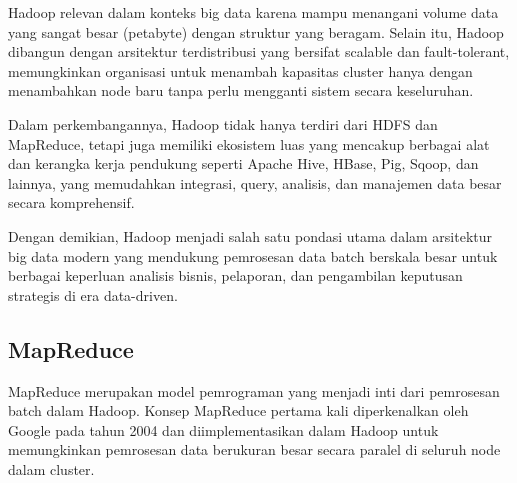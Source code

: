 Hadoop relevan dalam konteks big data karena mampu menangani volume data yang sangat besar (petabyte) dengan struktur yang beragam. Selain itu, Hadoop dibangun dengan arsitektur terdistribusi yang bersifat scalable dan fault-tolerant, memungkinkan organisasi untuk menambah kapasitas cluster hanya dengan menambahkan node baru tanpa perlu mengganti sistem secara keseluruhan.

Dalam perkembangannya, Hadoop tidak hanya terdiri dari HDFS dan MapReduce, tetapi juga memiliki ekosistem luas yang mencakup berbagai alat dan kerangka kerja pendukung seperti Apache Hive, HBase, Pig, Sqoop, dan lainnya, yang memudahkan integrasi, query, analisis, dan manajemen data besar secara komprehensif.

Dengan demikian, Hadoop menjadi salah satu pondasi utama dalam arsitektur big data modern yang mendukung pemrosesan data batch berskala besar untuk berbagai keperluan analisis bisnis, pelaporan, dan pengambilan keputusan strategis di era data-driven.


\subsection{MapReduce}

MapReduce merupakan model pemrograman yang menjadi inti dari pemrosesan batch dalam Hadoop. Konsep MapReduce pertama kali diperkenalkan oleh Google pada tahun 2004 dan diimplementasikan dalam Hadoop untuk memungkinkan pemrosesan data berukuran besar secara paralel di seluruh node dalam cluster.

